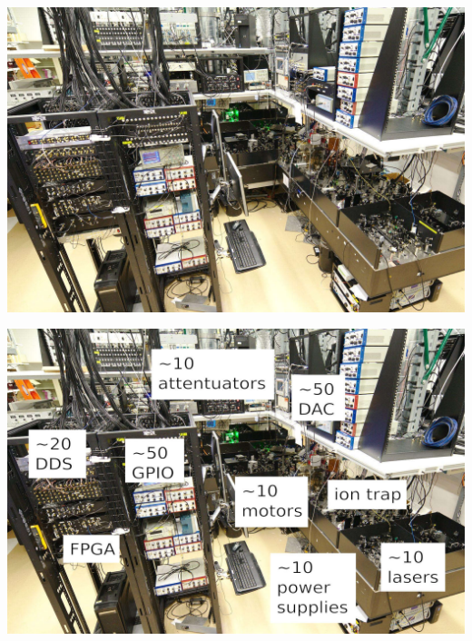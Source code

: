 \documentclass[final,presentation,compress]{beamer}
\begin{document}
\begin{frame}
  \includegraphics[width=\columnwidth]{lab}
\end{frame}

\begin{frame}
  \includegraphics[width=\columnwidth]{lab_hardware}
\end{frame}
\end{document}
